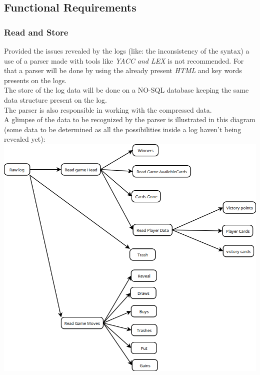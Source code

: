 \documentclass{scrreprt}
\begin{document}
\subsection{Functional Requirements}


\subsubsection{Read and Store}
Provided the issues revealed by the logs (like: the inconsistency of the syntax)
a use of a parser made with tools like \textit{YACC and LEX} is not recommended.
For that a parser will be done by using the already present \textit{HTML} and
key words presents on the logs.\\

The store of the log data will be done on a NO-SQL database keeping the same
data structure present on the log.\\

The parser is also responsible in working with the compressed data.\\
\newpage
A glimpse of the data to be recognized by the parser is illustrated in this
diagram (some data to be determined as all the possibilities inside a log
haven't being revealed yet):\\
\includegraphics[width=\textwidth,height=\textheight,keepaspectratio]{UseCaseParser}
\end{document}

